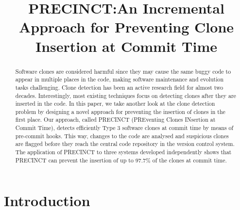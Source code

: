\documentclass[conference]{IEEEtran}
\begin{document}
\title{PRECINCT:\@ An Incremental Approach for Preventing Clone Insertion at Commit Time}


\author{
\and
{}
}

\maketitle

\begin{abstract}
Software clones are considered harmful since they may cause the same buggy code to appear in multiple places in the code, making software maintenance and evolution tasks challenging. Clone detection has been an active research field for almost two decades.
Interestingly, most existing techniques focus on detecting clones after they are inserted in the code.
In this paper, we take another look at the clone detection problem by designing a novel approach for preventing the insertion of clones in the first place. Our approach, called PRECINCT (PREventing Clones INsertion at Commit Time),  detects efficiently Type 3 software clones at commit time by means of pre-commit hooks.
This way, changes to the code are analysed and suspicious clones are flagged before they reach the central code repository in the version control system.  The application of PRECINCT to three systems developed independently shows that PRECINCT can prevent the insertion of up to 97.7\% of the clones at commit time.


\end{abstract}


\IEEEpeerreviewmaketitle

\section{Introduction}
\label{sec:Introduction}
\end{document}
